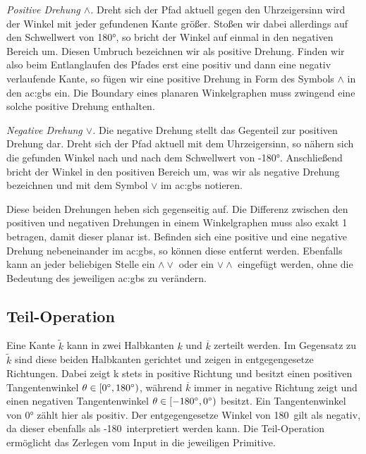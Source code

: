 \textit{Positive Drehung \(\wedge\).} Dreht sich der Pfad aktuell gegen den Uhrzeigersinn wird der Winkel mit jeder gefundenen Kante größer. Stoßen wir
dabei allerdings auf den Schwellwert von 180°, so bricht der Winkel auf einmal in den negativen Bereich um. Diesen Umbruch bezeichnen wir als
positive Drehung. Finden wir also beim Entlanglaufen des Pfades erst eine positiv und dann eine negativ verlaufende Kante, so fügen wir eine
positive Drehung in Form des Symbols \(\wedge\) in den \gls{ac:gbs} ein. Die Boundary eines planaren Winkelgraphen muss zwingend eine
solche positive Drehung enthalten.

\textit{Negative Drehung \(\vee\).} Die negative Drehung stellt das Gegenteil zur positiven Drehung dar. Dreht sich der Pfad aktuell mit dem
Uhrzeigersinn, so nähern sich die gefunden Winkel nach und nach dem Schwellwert von -180°. Anschließend bricht der Winkel in den positiven Bereich
um, was wir als negative Drehung bezeichnen und mit dem Symbol \(\vee\) im \gls{ac:gbs} notieren.

Diese beiden Drehungen heben sich gegenseitig auf. Die Differenz zwischen den positiven und negativen Drehungen in einem Winkelgraphen muss also
exakt 1 betragen, damit dieser planar ist. Befinden sich eine positive und eine negative Drehung nebeneinander im \gls{ac:gbs}, so können
diese entfernt werden. Ebenfalls kann an jeder beliebigen Stelle ein \(\wedge\vee\) oder ein \(\vee\wedge\) eingefügt werden, ohne die Bedeutung
des jeweiligen \gls{ac:gbs} zu verändern.


\subsection{Teil-Operation}
Eine Kante \(\tilde{k}\) kann in zwei Halbkanten \(k\) und \(\overline{k}\) zerteilt werden. Im Gegensatz zu \(\tilde{k}\)
sind diese beiden Halbkanten gerichtet und zeigen in entgegengesetze Richtungen. Dabei zeigt k stets in positive Richtung und besitzt einen
positiven Tangentenwinkel \(\theta \in [0\degree,180\degree) \), während \(\overline{k}\) immer in negative Richtung zeigt und einen negativen
Tangentenwinkel \(\theta \in [-180\degree,0\degree) \) besitzt. Ein Tangentenwinkel von 0° zählt hier als positiv. Der entgegengesetze Winkel
von 180\degree\ gilt als negativ, da dieser ebenfalls als -180\degree\ interpretiert werden kann. Die Teil-Operation ermöglicht das Zerlegen vom
Input in die jeweiligen Primitive.

